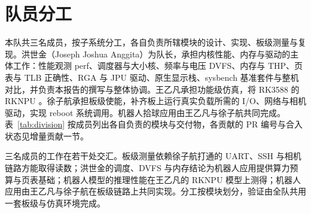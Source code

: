 \section{队员分工}

本队共三名成员，按子系统分工，各自负责所辖模块的设计、实现、板级测量与复现。洪世金（Joseph Joshua Anggita）为队长，承担内核性能、内存与驱动的主体工作：性能观测 perf、调度器与大小核、频率与电压 DVFS、内存与 THP、页表与 TLB 正确性、RGA 与 JPU 驱动、原生显示栈、sysbench 基准套件与整机对比，并负责本报告的撰写与整体协调。王乙凡承担功能级仿真，将 RK3588 的 RKNPU 。徐子航承担板级使能，补齐板上运行真实负载所需的 I/O、网络与相机驱动，实现 reboot 系统调用。机器人拾球应用由王乙凡与徐子航共同完成。表~\ref{tab:division} 按成员列出各自负责的模块与交付物，各贡献的 PR 编号与合入状态见增量贡献一节。

三名成员的工作在若干处交汇。板级测量依赖徐子航打通的 UART、SSH 与相机链路方能取得读数；洪世金的调度、DVFS 与内存结论为机器人应用提供算力预算与页表基础；机器人模型的推理性能在王乙凡的 RKNPU 模型上测得；机器人应用由王乙凡与徐子航在板级链路上共同实现。分工按模块划分，验证由全队共用一套板级与仿真环境完成。

